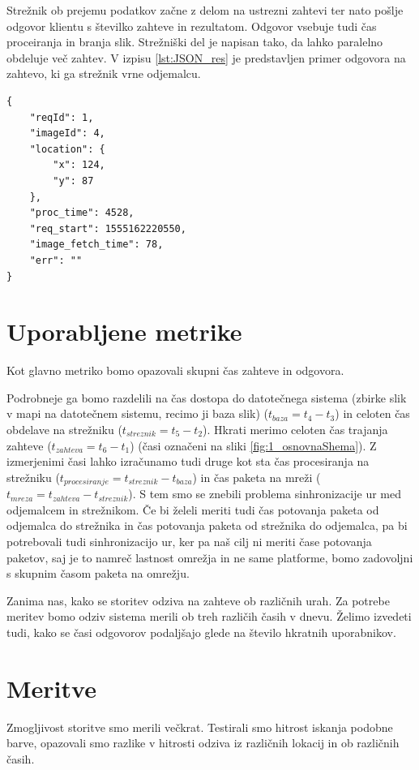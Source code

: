 Strežnik ob prejemu podatkov začne z delom na ustrezni zahtevi ter nato pošlje odgovor klientu s številko zahteve in rezultatom. Odgovor vsebuje tudi čas proceiranja in branja slik. Strežniški del je napisan tako, da lahko paralelno obdeluje več zahtev. V izpisu  \ref{lst:JSON_res} je predstavljen primer odgovora na zahtevo, ki ga strežnik vrne odjemalcu.

\begin{lstlisting}[caption={Primer JSON odgovora.},label={lst:JSON_res}]
{
	"reqId": 1,
	"imageId": 4,
	"location": {
		"x": 124,
		"y": 87	
	},
	"proc_time": 4528,
	"req_start": 1555162220550,
	"image_fetch_time": 78,
	"err": ""
}
\end{lstlisting}

\section{Uporabljene metrike}

Kot glavno metriko bomo opazovali skupni čas zahteve in odgovora.

Podrobneje ga bomo razdelili na čas dostopa do datotečnega sistema (zbirke slik v mapi na datotečnem sistemu, recimo ji baza slik) ($t_{baza} = t_4 - t_3$) in celoten čas obdelave na strežniku ($t_{streznik} = t_5 - t_2$). Hkrati merimo celoten čas trajanja zahteve ($t_{zahteva} = t_6 - t_1$) (časi označeni na sliki \ref{fig:1_osnovnaShema}). Z izmerjenimi časi lahko izračunamo tudi druge kot sta čas procesiranja na strežniku ($t_{procesiranje} = t_{streznik} - t_{baza}$) in čas paketa na mreži ($t_{mreza} = t_{zahteva} - t_{streznik}$). S tem smo se znebili problema sinhronizacije ur med odjemalcem in strežnikom. Če bi želeli meriti tudi čas potovanja paketa od odjemalca do strežnika in čas potovanja paketa od strežnika do odjemalca, pa bi potrebovali tudi sinhronizacijo ur, ker pa naš cilj ni meriti čase potovanja paketov, saj je to namreč lastnost omrežja in ne same platforme, bomo zadovoljni s skupnim časom paketa na omrežju.

Zanima nas, kako se storitev odziva na zahteve ob različnih urah. Za potrebe meritev bomo odziv sistema merili ob treh različih časih v dnevu. Želimo izvedeti tudi, kako se časi odgovorov podaljšajo glede na število hkratnih uporabnikov.

\section{Meritve}

Zmogljivost storitve smo merili večkrat.
Testirali smo hitrost iskanja podobne barve, opazovali smo razlike v hitrosti odziva iz različnih lokacij in ob različnih časih.

